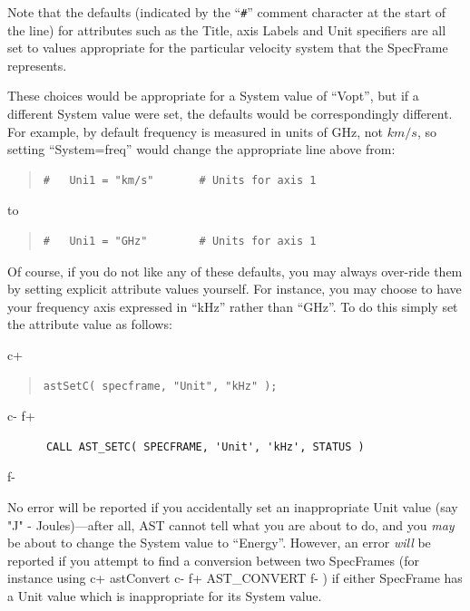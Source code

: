 \documentclass[twoside,11pt]{article}
\begin{document}
Note that the defaults (indicated by the ``\verb?#?'' comment
character at the start of the line) for attributes such as the Title,
axis Labels and Unit specifiers are all set to values appropriate
for the particular velocity system that the SpecFrame represents.

These choices would be appropriate for a System value of ``Vopt'',
but if a different System value were set, the defaults would be
correspondingly different. For example, by default frequency is measured in
units of GHz, not $km/s$, so setting ``System=freq''
would change the appropriate line above from:

\begin{quote}
\begin{verbatim}
#   Uni1 = "km/s"       # Units for axis 1
\end{verbatim}
\end{quote}

to

\begin{quote}
\begin{verbatim}
#   Uni1 = "GHz"        # Units for axis 1
\end{verbatim}
\end{quote}

Of course, if you do not like any of these defaults, you may always
over-ride them by setting explicit attribute values yourself. For
instance, you may choose to have your frequency axis expressed in ``kHz''
rather than ``GHz''. To do this simply set the attribute value as follows:

c+
\begin{quote}
\small
\begin{verbatim}
astSetC( specframe, "Unit", "kHz" );
\end{verbatim}
\normalsize
\end{quote}
c-
f+
\small
\begin{verbatim}
      CALL AST_SETC( SPECFRAME, 'Unit', 'kHz', STATUS )
\end{verbatim}
\normalsize
f-

No error will be reported if you accidentally set an inappropriate Unit value
(say "J" - Joules)---after all, AST cannot tell what you are about to do,
and you \emph{may} be about to change the System value to ``Energy''.
However, an error \emph{will} be reported if you attempt to find a
conversion between two SpecFrames (for instance using
c+
astConvert
c-
f+
AST\_CONVERT
f-
) if either SpecFrame has a Unit value which is inappropriate for its
System value.
\end{document}
